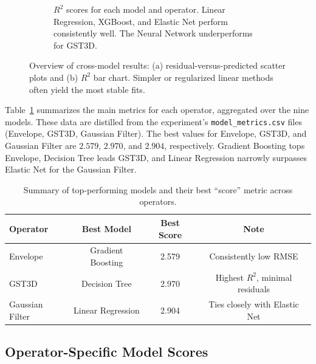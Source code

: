\begin{figure}[htbp]
\begin{subfigure}[t]{0.49\textwidth}
        \caption{$R^2$ scores for each model and operator.
        Linear Regression, XGBoost, and Elastic Net perform consistently well.
        The Neural Network underperforms for \ac{GST3D}.}
    \end{subfigure}
    \caption{Overview of cross-model results: (a) residual-versus-predicted scatter plots and (b) $R^2$ bar chart.
        Simpler or regularized linear methods often yield the most stable fits.
        \label{fig:residual_vs_predicted_and_r2_bar}
    }
\end{figure}

Table~\ref{tab:performance_summary} summarizes the main metrics for each operator, aggregated over the nine models.
These data are distilled from the experiment’s \texttt{model\_metrics.csv} files (Envelope, \ac{GST3D}, Gaussian Filter).
The best  values for Envelope, \ac{GST3D}, and Gaussian Filter are $2.579$, $2.970$, and $2.904$, respectively.
Gradient Boosting tops Envelope, Decision Tree leads \ac{GST3D}, and Linear Regression narrowly surpasses Elastic Net for the Gaussian Filter.

\begin{table}[htbp]
    \centering
    \begin{tabular}{lccc}
        \hline
        \textbf{Operator} & \textbf{Best Model} & \textbf{Best Score} & \textbf{Note}                    \\
        \hline
        Envelope          & Gradient Boosting   & 2.579               & Consistently low RMSE            \\
        \ac{GST3D}        & Decision Tree       & 2.970               & Highest $R^2$, minimal residuals \\
        Gaussian Filter   & Linear Regression   & 2.904               & Ties closely with Elastic Net    \\
        \hline
    \end{tabular}
    \caption{Summary of top-performing models and their best “score” metric across operators.}
    \label{tab:performance_summary}
\end{table}

\subsection{Operator-Specific Model Scores}
\label{subsec:operator-specific-model-scores}

